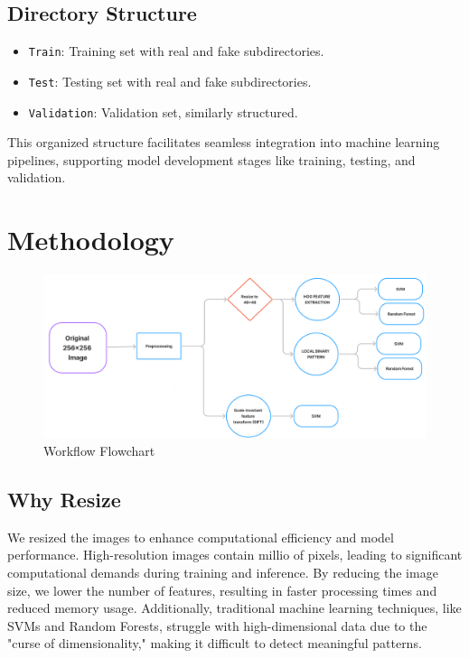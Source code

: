 \documentclass[10pt,twocolumn,letterpaper]{article}
\begin{document}
\subsection{Directory Structure}

\begin{itemize}
    \item \texttt{Train}: Training set with real and fake subdirectories.
    \item \texttt{Test}: Testing set with real and fake subdirectories.
    \item \texttt{Validation}: Validation set, similarly structured.
\end{itemize}

This organized structure facilitates seamless integration into machine learning pipelines, supporting model development stages like training, testing, and validation.

\section{Methodology}
\begin{figure}[h]
    \centering
    \includegraphics[width=\linewidth]{1.png}
    \caption{Workflow Flowchart}
\end{figure}
\subsection{Why Resize}
We resized the images to enhance computational efficiency and model performance. High-resolution images contain millio of pixels, leading to significant computational demands during training and inference. By reducing the image size, we lower the number of features, resulting in faster processing times and reduced memory usage. Additionally, traditional machine learning techniques, like SVMs and Random Forests, struggle with high-dimensional data due to the "curse of dimensionality," making it difficult to detect meaningful patterns.
\end{document}
